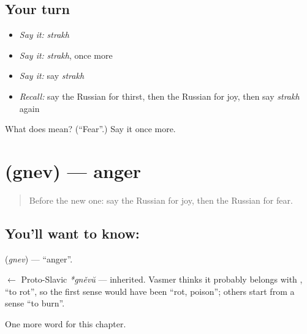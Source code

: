 \subsection*{Your turn}
\begin{itemize}
\raggedright
  \item \emph{Say it:} \emph{strakh}
  \item \emph{Say it:} \emph{strakh}, once more
  \item \emph{Say it:} say \emph{strakh}
  \item \emph{Recall:} say the Russian for thirst, then the Russian for joy, then say \emph{strakh} again
\end{itemize}

\begin{tcolorbox}[breakable,colback=teal!4,colframe=teal!35!black,title={Before you move on}]
What does  mean? (\textquotedblleft{}Fear\textquotedblright{}.) Say it once more.
\end{tcolorbox}
\section[\texorpdfstring{\ru{гнев} (gnev)}{гнев (gnev)}]{ (gnev) — anger}

\label{lesson:RU-C34-anger}



\begin{quote}
Before the new one: say the Russian for joy, then the Russian for fear.
\end{quote}

\subsection*{You'll want to know: }
\textbf{} (\emph{gnev}) — \textquotedblleft{}anger\textquotedblright{}.

\begin{cousinweb}
\textbf{} $\leftarrow$ Proto-Slavic \emph{*gněvŭ} — inherited. Vasmer thinks it probably belongs with \emph{}, \textquotedblleft{}to rot\textquotedblright{}, so the first sense would have been \textquotedblleft{}rot, poison\textquotedblright{}; others start from a sense \textquotedblleft{}to burn\textquotedblright{}.
\end{cousinweb}

\begin{grammarlens}[title={What you've built}]
One more word for this chapter.
\end{grammarlens}

